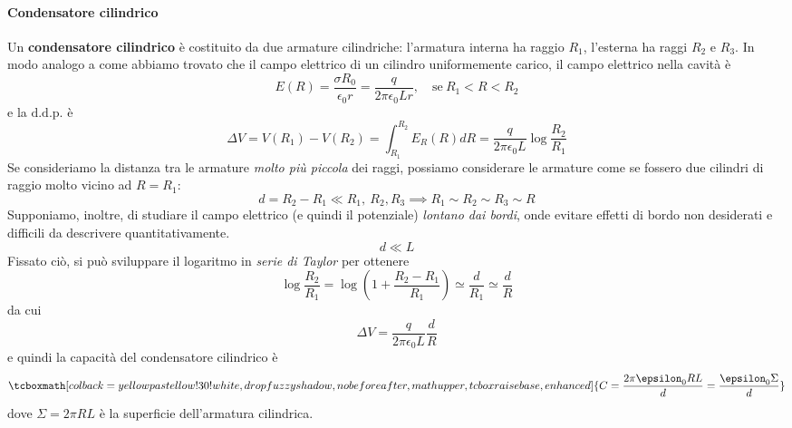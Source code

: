 \paragraph{Condensatore cilindrico}
Un \textbf{condensatore cilindrico} è costituito da due armature cilindriche: l'armatura interna ha raggio $R_1$, l'esterna ha raggi $R_2$ e $R_3$.
In modo analogo a come abbiamo trovato che il campo elettrico di un cilindro uniformemente carico, %
il campo elettrico nella cavità è
\begin{equation*}
	E(R)=\frac{\sigma R_0}{\epsilon_0r}=\frac{q}{2\pi\epsilon_0Lr},\quad\text{se}\ R_1<R<R_2
\end{equation*}
e la $\textrm{d.d.p.}$ è
\begin{equation*}
	\Delta V=V(R_1)-V(R_2)=\int_{R_1}^{R_2}E_R(R)dR=\frac{q}{2\pi\epsilon_0L}\log\frac{R_2}{R_1}
\end{equation*}
Se consideriamo la distanza tra le armature \textit{molto più piccola} dei raggi, possiamo considerare le armature come se fossero due cilindri di raggio molto vicino ad $R=R_1$:
\begin{equation*}
	d=R_2-R_1\ll R_1,\ R_2, R_3\implies R_1\sim R_2\sim R_3\sim R
\end{equation*}
Supponiamo, inoltre, di studiare il campo elettrico (e quindi il potenziale) \textit{lontano dai bordi}, onde evitare effetti di bordo non desiderati e difficili da descrivere quantitativamente.
\begin{equation*}
	d\ll L
\end{equation*}
Fissato ciò, si può sviluppare il logaritmo in \textit{serie di Taylor} per ottenere
\begin{equation*}
	\log\frac{R_2}{R_1}=\log\left(1+\frac{R_2-R_1}{R_1}\right)\simeq\frac{d}{R_1}\simeq\frac{d}{R}
\end{equation*}
da cui
\begin{equation*}
	\Delta V=\frac{q}{2\pi\epsilon_0L}\frac{d}{R}
\end{equation*}
e quindi la capacità del condensatore cilindrico è
\begin{equation}
	\tcboxmath[colback=yellowpastellow!30!white,drop fuzzy shadow, nobeforeafter, math upper, tcbox raise base, enhanced]{C=\frac{2\pi\epsilon_0RL}{d}=\frac{\epsilon_0\Sigma}{d}}
\end{equation}
dove $\Sigma=2\pi RL$ è la superficie dell'armatura cilindrica.

